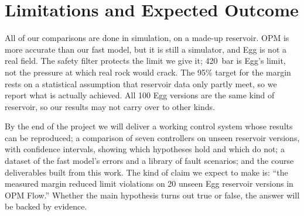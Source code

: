 \documentclass[11pt,letterpaper]{article}
\begin{document}
\section{Limitations and Expected Outcome}

All of our comparisons are done in simulation, on a made-up reservoir. OPM is more accurate
than our fast model, but it is still a simulator, and Egg is not a real field. The safety
filter protects the limit we give it; \SI{420}{\bar} is Egg's limit, not the pressure at
which real rock would crack. The 95\% target for the margin rests on a statistical
assumption that reservoir data only partly meet, so we report what is actually achieved.
All 100 Egg versions are the same kind of reservoir, so our results may not carry over to
other kinds.

By the end of the project we will deliver a working control system whose results can be
reproduced; a comparison of seven controllers on unseen reservoir versions, with confidence
intervals, showing which hypotheses hold and which do not; a dataset of the fast model's
errors and a library of fault scenarios; and the course deliverables built from this work.
The kind of claim we expect to make is: ``the measured margin reduced limit violations on
20 unseen Egg reservoir versions in OPM Flow.'' Whether the main hypothesis turns out true
or false, the answer will be backed by evidence.



\end{document}
